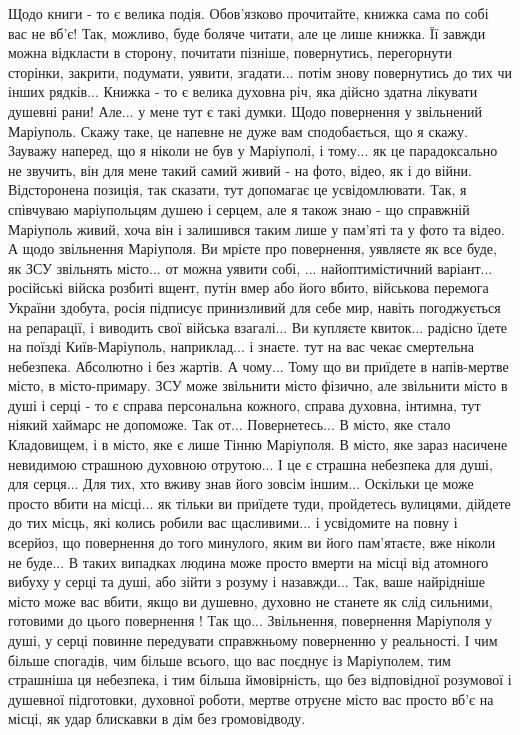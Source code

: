Щодо книги - то є велика подія. Обов'язково прочитайте, книжка сама по собі вас
не вб'є!  Так, можливо, буде боляче читати, але це лише книжка. Її завжди можна
відкласти в сторону, почитати пізніше, повернутись, перегорнути сторінки,
закрити, подумати, уявити, згадати...  потім знову повернутись до тих чи інших
рядків... Книжка - то є велика духовна річ, яка дійсно здатна лікувати душевні
рани! Але... у мене тут є такі думки. Щодо повернення у звільнений Маріуполь.
Скажу таке, це напевне не дуже вам сподобається, що я скажу. Зауважу наперед,
що я ніколи не був у Маріуполі, і тому... як це парадоксально не звучить, він
для мене такий самий живий - на фото, відео, як і до війни. Відсторонена
позиція, так сказати, тут допомагає це усвідомлювати.  Так, я співчуваю
маріупольцям душею і серцем, але я також знаю - що справжній Маріуполь живий,
хоча він і залишився таким лише у пам'яті та у фото та відео. А щодо звільнення
Маріуполя. Ви мрієте про повернення, уявляєте як все буде, як ЗСУ звільнять
місто... от можна уявити собі, ...  найоптимістичний варіант... російські
війска розбиті вщент, путін вмер або його вбито, військова перемога України
здобута, росія підписує принизливий для себе мир, навіть погоджується на
репарації, і виводить свої війська взагалі... Ви купляєте квиток... радісно
їдете на поїзді Київ-Маріуполь, наприклад... і знаєте. тут на вас чекає
смертельна небезпека. Абсолютно і без жартів.  А чому... Тому що ви приїдете в
напів-мертве місто, в місто-примару. ЗСУ може звільнити місто фізично, але
звільнити місто в душі і серці - то є справа персональна кожного, справа
духовна, інтимна, тут ніякий хаймарс не допоможе. Так от... Повернетесь... В
місто, яке стало Кладовищем, і в місто, яке є лише Тінню Маріуполя. В місто,
яке зараз насичене невидимою страшною духовною отрутою... І це є страшна
небезпека для душі, для серця... Для тих, хто вживу знав його зовсім іншим...
Оскільки це може просто вбити на місці... як тільки ви приїдете туди,
пройдетесь вулицями, дійдете до тих місць, які колись робили вас щасливими... і
усвідомите на повну і всерйоз, що повернення до того минулого, яким ви його
пам'ятаєте, вже ніколи не буде... В таких випадках людина може просто вмерти на
місці від атомного вибуху у серці та душі, або зійти з розуму і назавжди...
Так, ваше найрідніше місто може вас вбити, якщо ви душевно, духовно не станете
як слід сильними, готовими до цього повернення !  Так що...  Звільнення,
повернення Маріуполя у душі, у серці повинне передувати справжньому поверненню
у реальності.  І чим більше спогадів, чим більше всього, що вас поєднує із
Маріуполем, тим страшніша ця небезпека, і тим більша ймовірність, що без
відповідної розумової і душевної підготовки, духовної роботи, мертве отруєне
місто вас просто вб'є на місці, як удар блискавки в дім без громовідводу.

